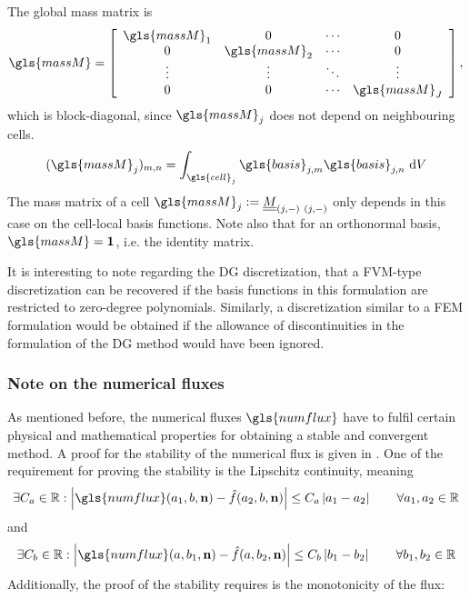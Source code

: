 The global mass matrix is
\begin{equation}
	{\gls{massM}} =
	\left[ 
	\begin{array}{cccc}
		{\gls{massM}}_{1} & 0 & \cdots & 0 \\
		0 & {\gls{massM}}_{2} & \cdots & 0 \\
		\vdots & \vdots & \ddots & \vdots \\
		0 & 0 & \cdots & {\gls{massM}}_{J}
	\end{array}
	\right],
\end{equation} 
which is block-diagonal, since  ${\gls{massM}}_{j}$ does not depend on neighbouring cells. 
\begin{equation}
	({\gls{massM}}_j)_{m,n} = \int_{\gls{cell}_j} \gls{basis}_{j,m} \gls{basis}_{j,n} \d{V}	\label{eq:massMatrix}
\end{equation} 
The mass matrix of a cell ${\gls{massM}}_{j} := \matrixDG{M}_{(j,-) \ (j,-)} $ only depends in this case on the cell-local basis functions. Note also that for an orthonormal basis, $\gls{massM} = \mathbf{1}$, i.e. the identity matrix.

It is interesting to note regarding the DG discretization, that a \gls{FVM}-type  discretization can be recovered if the basis functions in this formulation are restricted to zero-degree polynomials. Similarly, a discretization similar to a \gls{FEM} formulation would be obtained if the allowance of discontinuities in the formulation of the DG method would have been ignored.
\subsubsection{Note on the numerical fluxes}
As mentioned before, the numerical fluxes $\gls{numflux}$ have to fulfil certain physical and mathematical properties for obtaining a stable and convergent method. A proof for the stability of the numerical flux is given in \textcite{dipietroMathematicalAspectsDiscontinuous2012}. One of the requirement for proving the stability is the Lipschitz continuity, meaning 
\begin{equation}
	\label{eq:flux_lipschitz_first}
	\exists C_a \in \mathbb{R}: \abs{\gls{numflux}(a_1, b, \vec{n}) - \hat{f}(a_2, b, \vec{n})} \leq C_a \abs{a_1 - a_2} 
	\qquad \forall a_1, a_2 \in \mathbb{R}
\end{equation}
and
\begin{equation}
	\label{eq:flux_lipschitz_second}
	\exists C_b \in \mathbb{R}: \abs{\gls{numflux}(a, b_1, \vec{n}) - \hat{f}(a, b_2, \vec{n})} \leq C_b \abs{b_1 - b_2} 
	\qquad \forall b_1, b_2 \in \mathbb{R}
\end{equation}
Additionally, the proof of the stability requires is the monotonicity of the flux:


